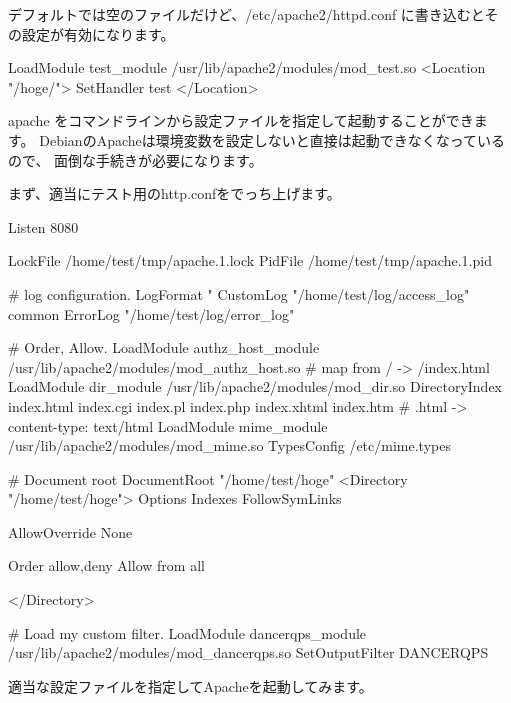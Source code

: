 \documentclass[mingoth,a4paper]{jsarticle}
\begin{document}

デフォルトでは空のファイルだけど、/etc/apache2/httpd.conf に書き込むとそ
の設定が有効になります。

\begin{commandline}
LoadModule test_module /usr/lib/apache2/modules/mod_test.so
<Location "/hoge/">
   SetHandler test
</Location>
\end{commandline}


apache をコマンドラインから設定ファイルを指定して起動することができます。
DebianのApacheは環境変数を設定しないと直接は起動できなくなっているので、
面倒な手続きが必要になります。

まず、適当にテスト用のhttp.confをでっち上げます。

\begin{commandline}
Listen 8080

LockFile /home/test/tmp/apache.1.lock
PidFile /home/test/tmp/apache.1.pid

# log configuration.
LogFormat "%
CustomLog "/home/test/log/access_log" common
ErrorLog "/home/test/log/error_log"

# Order, Allow.
LoadModule authz_host_module /usr/lib/apache2/modules/mod_authz_host.so
# map from / -> /index.html
LoadModule dir_module /usr/lib/apache2/modules/mod_dir.so
DirectoryIndex index.html index.cgi index.pl index.php index.xhtml index.htm
# .html -> content-type: text/html
LoadModule mime_module /usr/lib/apache2/modules/mod_mime.so
TypesConfig /etc/mime.types

# Document root
DocumentRoot "/home/test/hoge"
<Directory "/home/test/hoge">
    Options Indexes FollowSymLinks

    AllowOverride None

    Order allow,deny
    Allow from all

</Directory>

# Load my custom filter.
LoadModule dancerqps_module /usr/lib/apache2/modules/mod_dancerqps.so
SetOutputFilter DANCERQPS
\end{commandline}

適当な設定ファイルを指定してApacheを起動してみます。

\end{document}
